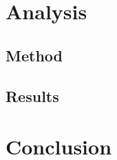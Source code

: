 \documentclass{article}
\begin{document}
\section{Analysis}
\lipsum

\subsection{Method}
\lipsum
\subsection{Results}
\lipsum

\section{Conclusion}
\lipsum



\end{document}
